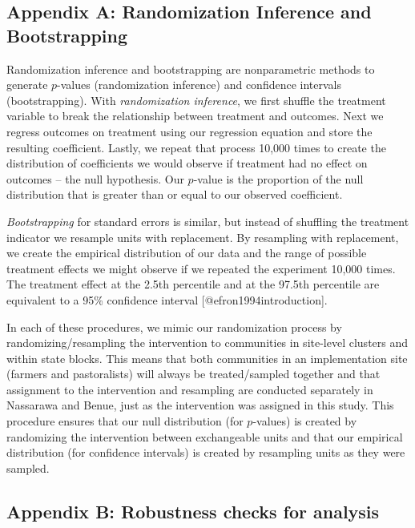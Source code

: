 \documentclass[
]{article}
\begin{document}
\hypertarget{appendix-a-randomization-inference-and-bootstrapping}{%
\subsection{Appendix A: Randomization Inference and
Bootstrapping}\label{appendix-a-randomization-inference-and-bootstrapping}}

Randomization inference and bootstrapping are nonparametric methods to
generate \(p\)-values (randomization inference) and confidence intervals
(bootstrapping). With \emph{randomization inference}, we first shuffle
the treatment variable to break the relationship between treatment and
outcomes. Next we regress outcomes on treatment using our regression
equation and store the resulting coefficient. Lastly, we repeat that
process 10,000 times to create the distribution of coefficients we would
observe if treatment had no effect on outcomes -- the null hypothesis.
Our \(p\)-value is the proportion of the null distribution that is
greater than or equal to our observed coefficient.

\emph{Bootstrapping} for standard errors is similar, but instead of
shuffling the treatment indicator we resample units with replacement. By
resampling with replacement, we create the empirical distribution of our
data and the range of possible treatment effects we might observe if we
repeated the experiment 10,000 times. The treatment effect at the 2.5th
percentile and at the 97.5th percentile are equivalent to a 95\%
confidence interval {[}@efron1994introduction{]}.

In each of these procedures, we mimic our randomization process by
randomizing/resampling the intervention to communities in site-level
clusters and within state blocks. This means that both communities in an
implementation site (farmers and pastoralists) will always be
treated/sampled together and that assignment to the intervention and
resampling are conducted separately in Nassarawa and Benue, just as the
intervention was assigned in this study. This procedure ensures that our
null distribution (for \(p\)-values) is created by randomizing the
intervention between exchangeable units and that our empirical
distribution (for confidence intervals) is created by resampling units
as they were sampled.

\hypertarget{appendix-b-robustness-checks-for-analysis}{%
\subsection{Appendix B: Robustness checks for
analysis}\label{appendix-b-robustness-checks-for-analysis}}
\end{document}
